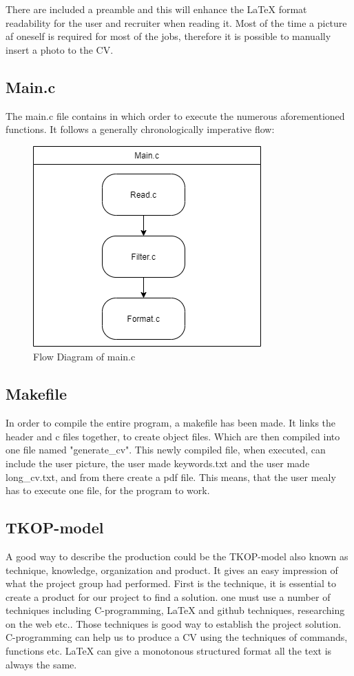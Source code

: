There are included a preamble and this will enhance the LaTeX format readability for the user and recruiter when reading it. 
Most of the time a picture af oneself is required for most of the jobs, therefore it is possible to manually insert a photo to the CV. 

\subsection{Main.c}
The main.c file contains in which order to execute the numerous aforementioned functions.
It follows a generally chronologically imperative flow:
\begin{figure}[H]
  \centering
  \includegraphics[scale = 0.6]{figures/main.png}
  \caption{Flow Diagram of main.c}
\end{figure}
\subsection{Makefile}
In order to compile the entire program, a makefile has been made.
It links the header and c files together, to create object files.
Which are then compiled into one file named "generate_cv".
This newly compiled file, when executed, can include the user picture,
the user made keywords.txt and the user made long_cv.txt, and from there create a pdf file.
This means, that the user mealy has to execute one file, for the program to work.\newpage
\subsection{TKOP-model}
A good way to describe the production could be the TKOP-model also known as technique, knowledge, organization and product.
It gives an easy impression of what the project group had performed.
First is the technique, it is essential to create a product for our project to find a solution. 
one must use a number of techniques including C-programming, LaTeX and github techniques, researching on the web etc..
Those techniques is good way to establish the project solution. C-programming can help us to produce a CV using the techniques
of commands, functions etc. LaTeX can give a monotonous structured format all the text is always the same. \\


